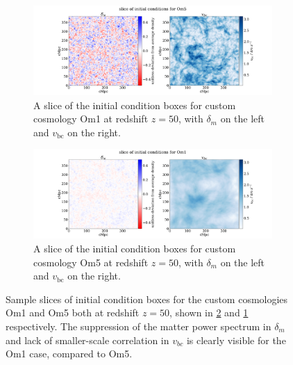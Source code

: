\documentclass[floats,floatfix,showpacs,amssymb,prd,superscriptaddress,nofootinbib]{revtex4-2} %
\begin{document}

\begin{figure}[H]
     \centering
     \begin{subfigure}[b]{0.9\textwidth}
         \centering
         \includegraphics[width=\textwidth]{images/ic_grids/initial_condition_grid_Om5.png}
         \caption{A slice of the initial condition boxes for custom cosmology Om1 at redshift $z = 50$, with $\delta_m$ on the left and $v_{\text{bc}}$ on the right.}
         \label{fig:IC_Om5}
     \end{subfigure}
     \hfill
     \begin{subfigure}[b]{0.9\textwidth}
         \centering
         \includegraphics[width=\textwidth]{images/ic_grids/initial_condition_grid_Om1.png}
         \caption{A slice of the initial condition boxes for custom cosmology Om5 at redshift $z = 50$, with $\delta_m$ on the left and $v_{\text{bc}}$ on the right.}
         \label{fig:IC_Om1}
     \end{subfigure}
        \caption{Sample slices of initial condition boxes for the custom cosmologies Om1 and Om5 both at redshift $z = 50$, shown in \ref{fig:IC_Om1} and \ref{fig:IC_Om5} respectively. The suppression of the matter power spectrum in $\delta_m$ and lack of smaller-scale correlation in $v_{bc}$ is clearly visible for the Om1 case, compared to Om5.}
        \label{fig:IC_custom}
\end{figure}
\end{document}
